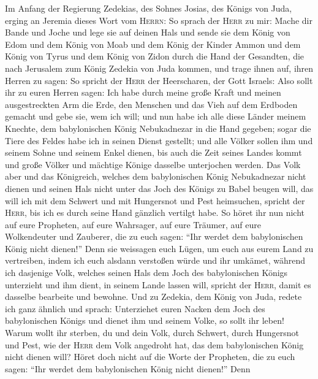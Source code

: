  Im Anfang der Regierung Zedekias, des Sohnes Josias, des
Königs von Juda, erging an Jeremia dieses Wort vom \textsc{Herrn}:
 So sprach der \textsc{Herr} zu mir: Mache dir Bande und
Joche und lege sie auf deinen Hals  und sende sie dem
König von Edom und dem König von Moab und dem König der Kinder Ammon und
dem König von Tyrus und dem König von Zidon durch die Hand der
Gesandten, die nach Jerusalem zum König Zedekia von Juda kommen,
 und trage ihnen auf, ihren Herren zu sagen: So spricht
der \textsc{Herr} der Heerscharen, der Gott Israels: Also sollt ihr zu
euren Herren sagen:  Ich habe durch meine große Kraft und
meinen ausgestreckten Arm die Erde, den Menschen und das Vieh auf dem
Erdboden gemacht und gebe sie, wem ich will;  und nun habe
ich alle diese Länder meinem Knechte, dem babylonischen König
Nebukadnezar in die Hand gegeben; sogar die Tiere des Feldes habe ich in
seinen Dienst gestellt;  und alle Völker sollen ihm und
seinem Sohne und seinem Enkel dienen, bis auch die Zeit seines Landes
kommt und große Völker und mächtige Könige dasselbe unterjochen werden.
 Das Volk aber und das Königreich, welches dem
babylonischen König Nebukadnezar nicht dienen und seinen Hals nicht
unter das Joch des Königs zu Babel beugen will, das will ich mit dem
Schwert und mit Hungersnot und Pest heimsuchen, spricht der
\textsc{Herr}, bis ich es durch seine Hand gänzlich vertilgt habe.
 So höret ihr nun nicht auf eure Propheten, auf eure
Wahrsager, auf eure Träumer, auf eure Wolkendeuter und Zauberer, die zu
euch sagen: ``Ihr werdet dem babylonischen König nicht dienen!''
 Denn sie weissagen euch Lügen, um euch aus eurem Land zu
vertreiben, indem ich euch alsdann verstoßen würde und ihr umkämet,
 während ich dasjenige Volk, welches seinen Hals dem Joch
des babylonischen Königs unterzieht und ihm dient, in seinem Lande
lassen will, spricht der \textsc{Herr}, damit es dasselbe bearbeite und
bewohne.  Und zu Zedekia, dem König von Juda, redete ich
ganz ähnlich und sprach: Unterziehet euren Nacken dem Joch des
babylonischen Königs und dienet ihm und seinem Volke, so sollt ihr
leben!  Warum wollt ihr sterben, du und dein Volk, durch
Schwert, durch Hungersnot und Pest, wie der \textsc{Herr} dem Volk
angedroht hat, das dem babylonischen König nicht dienen will?
 Höret doch nicht auf die Worte der Propheten, die zu
euch sagen: ``Ihr werdet dem babylonischen König nicht dienen!'' Denn
